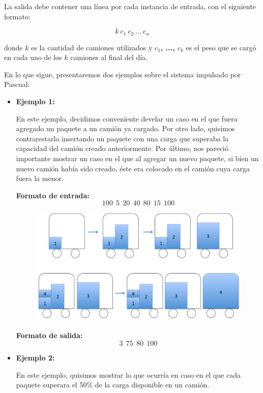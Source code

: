 La salida debe contener una línea por cada instancia de entrada, con el siguiente formato:

$$k\ c_{1}\ c_{2}\ ...\ c_{n}$$


donde \textbf{$k$} es la cantidad de camiones utilizados y \textbf{$c_{1}$, ..., $c_{k}$} es el peso que se cargó en cada uno de los \textbf{$k$} camiones al final del día.\newline

En lo que sigue, presentaremos dos ejemplos sobre el sistema impulsado por Pascual:
\begin{itemize}
\item \large{\textbf{Ejemplo 1:}}\newline

En este ejemplo, decidimos conveniente develar un caso en el que fuera agregado un paquete a un camión ya cargado. Por otro lado, quisimos contrarestarlo insertando un paquete con una carga que superaba la capacidad del camión creado anteriormente. Por último, nos pareció importante mostrar un caso en el que al agregar un nuevo paquete, si bien un nuevo camión había sido creado, éste era colocado en el camión cuya carga fuera la menor.

\textbf{Formato de entrada:}
$$100\ \ 5\ \ 20\ \ 40\ \ 80\ \ 15\ \ 100$$

\begin{figure}[H] %
\begin{center}
\includegraphics[width=320pt]{../imgs/ejemplo1.jpg}
\end{center}
\end{figure}

\textbf{Formato de salida:}
$$3\ \ 75\ \ 80\ \ 100$$


\item \large{\textbf{Ejemplo 2:}}\newline

En este ejemplo, quisimos mostrar lo que ocurría en caso en el que cada paquete superara el 50\% de la carga disponible en un camión.


\end{itemize}
